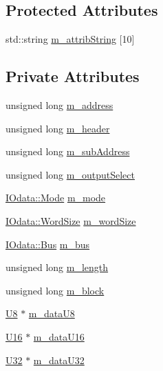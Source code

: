 \subsection*{Protected Attributes}
\begin{DoxyCompactItemize}
\item 
std\+::string \hyperlink{classAttrib_a3414521d7a82476e874b25a5407b5e63}{m\+\_\+attrib\+String} \mbox{[}10\mbox{]}
\end{DoxyCompactItemize}
\subsection*{Private Attributes}
\begin{DoxyCompactItemize}
\item 
unsigned long \hyperlink{classIOdata_a965810e1888b904c575277f50cea734a}{m\+\_\+address}
\item 
unsigned long \hyperlink{classIOdata_a46ec7dbfa257c02be1d39c4799f157d3}{m\+\_\+header}
\item 
unsigned long \hyperlink{classIOdata_a562f84e5cace1e392f1b0fca553fff78}{m\+\_\+sub\+Address}
\item 
unsigned long \hyperlink{classIOdata_acc46d71243b542e68277e242effa7f1b}{m\+\_\+output\+Select}
\item 
\hyperlink{classIOdata_a044e9a4a0c6d25a43ebfe29c4fa4f1e5}{I\+Odata\+::\+Mode} \hyperlink{classIOdata_a0782e31763fa855f1ecbd377dce538e6}{m\+\_\+mode}
\item 
\hyperlink{classIOdata_a37c53ebf4bf8d866aac8af572962a84c}{I\+Odata\+::\+Word\+Size} \hyperlink{classIOdata_a719b0ce607ada4fa91b12d6ecfa1b4c9}{m\+\_\+word\+Size}
\item 
\hyperlink{classIOdata_a99aa7bed39364c4359ab8a7596bc013c}{I\+Odata\+::\+Bus} \hyperlink{classIOdata_a42c07a9b3f43ec35dd18d13a67d294cc}{m\+\_\+bus}
\item 
unsigned long \hyperlink{classIOdata_afabe57441da019eb614d277799106aac}{m\+\_\+length}
\item 
unsigned long \hyperlink{classIOdata_a6d1ce9f88db6b97ce61098a3693e253f}{m\+\_\+block}
\item 
\hyperlink{classIOdata_a18d1354b7cdaf0f8a8001fdbb3ced418}{U8} $\ast$ \hyperlink{classIOdata_a9c4c0dc5104f7f3b170e30ab78fe61e7}{m\+\_\+data\+U8}
\item 
\hyperlink{classIOdata_a1eb45b348534a7c19a4a99b746e693ff}{U16} $\ast$ \hyperlink{classIOdata_a8d698e077b7898009691b9086a3e6453}{m\+\_\+data\+U16}
\item 
\hyperlink{classIOdata_a96fb57f5fcd87b708743abd3c86a5198}{U32} $\ast$ \hyperlink{classIOdata_a247cdaefd87084e3cad1d530d592d99a}{m\+\_\+data\+U32}
\end{DoxyCompactItemize}


